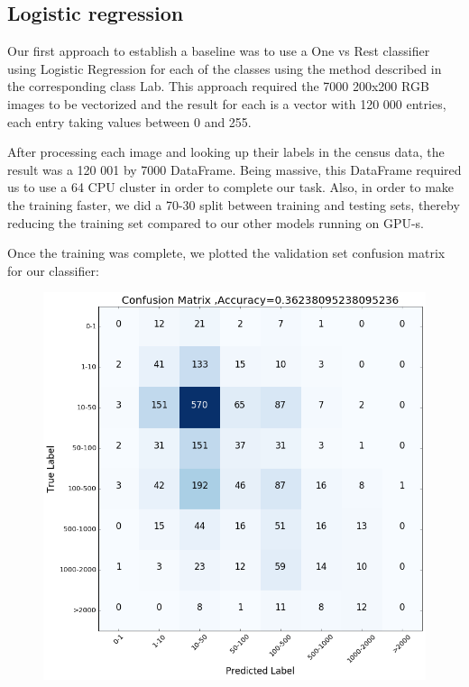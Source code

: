 \documentclass{article}
\begin{document}
\subsection{Logistic regression}
Our first approach to establish a baseline was to use a One vs Rest classifier using Logistic Regression for each of the classes using the method described in the corresponding class Lab. This approach required the 7000 200x200 RGB images to be vectorized and the result for each is a vector with 120 000 entries, each entry taking values between 0 and 255.

After processing each image and looking up their labels in the census data, the result was a 120 001 by 7000 DataFrame. Being massive, this DataFrame required us to use a 64 CPU cluster in order to complete our task. Also, in order to make the training faster, we did a 70-30 split between training and testing sets, thereby reducing the training set compared to our other models running on GPU-s.

Once the training was complete, we plotted the validation set confusion matrix for our classifier:

\begin{figure}[ht]
\centering
\includegraphics[scale=0.35]{yassine_cm.png}
\end{figure}
\end{document}

